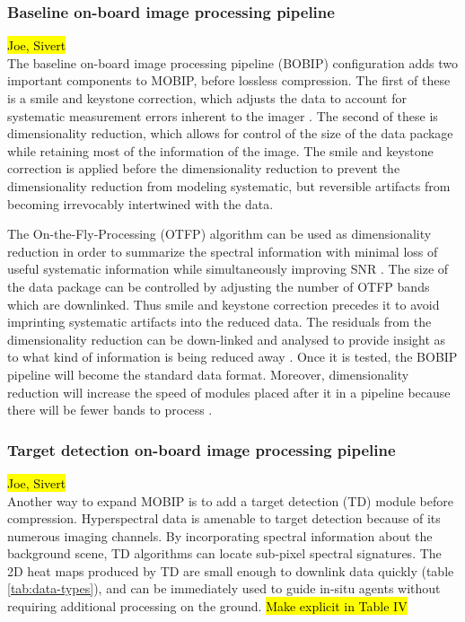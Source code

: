 \subsubsection{Baseline on-board image processing pipeline}
\hl{Joe, Sivert \\}
The baseline on-board image processing pipeline (BOBIP) configuration adds two important components to MOBIP, before lossless compression. The first of these is a smile and keystone correction, which adjusts the data to account for systematic measurement errors inherent to the imager \cite{Henriksen2019}. 
The second of these is dimensionality reduction, which allows for control of the size of the data package while retaining most of the information of the image. 
The smile and keystone correction is applied before the dimensionality reduction to prevent the dimensionality reduction from modeling systematic, but reversible artifacts from becoming irrevocably intertwined with the data. 

The On-the-Fly-Processing (OTFP) algorithm can be used as dimensionality reduction in order to summarize the spectral information with minimal loss of useful systematic information while simultaneously improving SNR \cite{Vit17}. 
The size of the data package can be controlled by adjusting the number of OTFP bands which are downlinked. 
Thus smile and keystone correction precedes it to avoid imprinting systematic artifacts into the reduced data. 
The residuals from the dimensionality reduction can be down-linked and analysed to provide insight as to what kind of information is being reduced away \cite{Vit17}.
Once it is tested, the BOBIP pipeline will become the standard data format. 
Moreover, dimensionality reduction will increase the speed of modules placed after it in a pipeline because there will be fewer bands to process \cite{Bakken2019SPIE}. 

\subsubsection{Target detection on-board image processing pipeline}
\hl{Joe, Sivert \\}
Another way to expand MOBIP is to add a target detection (TD) module before compression. 
Hyperspectral data is amenable to target detection because of its numerous imaging channels.
By incorporating spectral information about the background scene, TD algorithms can locate sub-pixel spectral signatures. 
The 2D heat maps produced by TD are small enough to downlink data quickly (table \ref{tab:data-types}), and can be immediately used to guide in-situ agents without requiring additional processing on the ground. \hl{Make explicit in Table IV}

